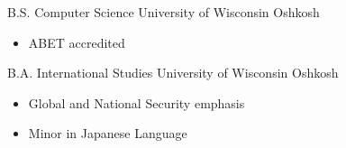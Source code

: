     {B.S. Computer Science}
    {University of Wisconsin Oshkosh}
    {}
    {}
    {\begin{itemize}
        \item ABET accredited
    \end{itemize}}
    {B.A. International Studies}
    {University of Wisconsin Oshkosh}
    {}
    {}
    {\begin{itemize}
        \item Global and National Security emphasis
        \item Minor in Japanese Language
    \end{itemize}}
